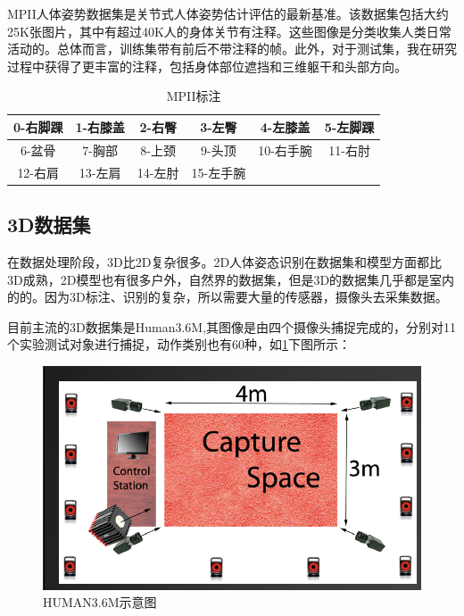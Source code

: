 MPII人体姿势数据集是关节式人体姿势估计评估的最新基准。该数据集包括大约25K张图片，其中有超过40K人的身体关节有注释。这些图像是分类收集人类日常活动的。总体而言，训练集带有前后不带注释的帧。此外，对于测试集，我在研究过程中获得了更丰富的注释，包括身体部位遮挡和三维躯干和头部方向。

\begin{table}[h]
    \centering
    \begin{tabular}{c|c|c|c|c|c}
        \hline
         0-右脚踝 &  1-右膝盖 & 2-右臀 & 3-左臀 & 4-左膝盖 & 5-左脚踝\\
        \hline
         6-盆骨 &  7-胸部 & 8-上颈 & 9-头顶 & 10-右手腕 & 11-右肘\\
        \hline
         12-右肩 &  13-左肩 & 14-左肘 & 15-左手腕 \\
        \hline
    \end{tabular}
    \caption{MPII标注}
    \label{MPII}
\end{table}

\subsection{3D数据集}

在数据处理阶段，3D比2D复杂很多。2D人体姿态识别在数据集和模型方面都比3D成熟，2D模型也有很多户外，自然界的数据集，但是3D的数据集几乎都是室内的的。因为3D标注、识别的复杂，所以需要大量的传感器，摄像头去采集数据。

目前主流的3D数据集是Human3.6M,其图像是由四个摄像头捕捉完成的，分别对11个实验测试对象进行捕捉，动作类别也有60种，如\ref{human_dataset}下图所示：

\begin{figure}[h]
	\includegraphics[width=\textwidth]{pic/human_dataset.png}
	\caption{HUMAN3.6M示意图}
	\label{human_dataset}
\end{figure}

